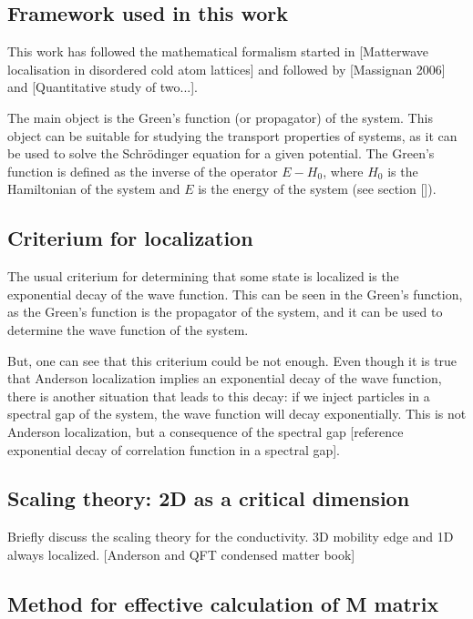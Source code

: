 

\subsection{Framework used in this work}

This work has followed the mathematical formalism started in [Matterwave localisation in disordered cold atom lattices] and followed by [Massignan 2006] and [Quantitative study of two...]. 

The main object is the Green's function (or propagator) of the system. This object can be suitable for studying the transport properties of systems, as it can be used to solve the Schrödinger equation for a given potential. The Green's function is defined as the inverse of the operator $E-H_0$, where $H_0$ is the Hamiltonian of the system and $E$ is the energy of the system (see section []). 

\subsection{Criterium for localization}

The usual criterium for determining that some state is localized is the exponential decay of the wave function. This can be seen in the Green's function, as the Green's function is the propagator of the system, and it can be used to determine the wave function of the system.

But, one can see that this criterium could be not enough. Even though it is true that Anderson localization implies an exponential decay of the wave function, there is another situation that leads to this decay: if we inject particles in a spectral gap of the system, the wave function will decay exponentially. This is not Anderson localization, but a consequence of the spectral gap [reference exponential decay of correlation function in a spectral gap].

\subsection{Scaling theory: 2D as a critical dimension}

Briefly discuss the scaling theory for the conductivity. 3D mobility edge and 1D always localized. [Anderson and QFT condensed matter book]

\subsection{Method for effective calculation of M matrix}

